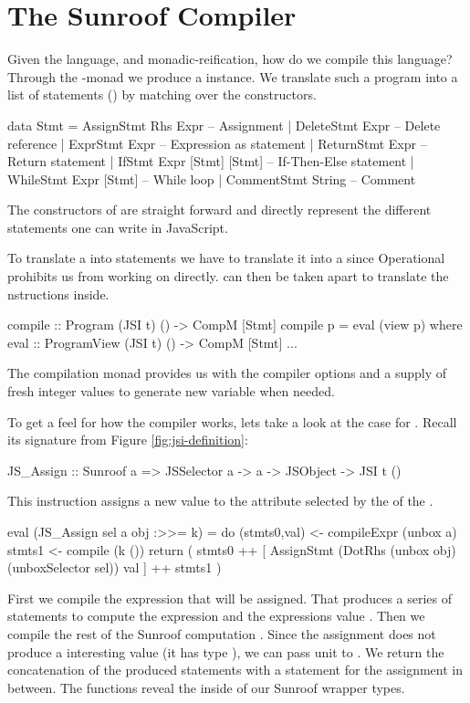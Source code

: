  
\section{The Sunroof Compiler}
\label{sec:compiler}

Given the language, and monadic-reification, how do we compile this language?
Through the \JS-monad we produce a  instance. We 
translate such a program into a list of statements () by matching over 
the \JSI constructors.
\begin{Code}
data Stmt 
  = AssignStmt Rhs Expr       -- Assignment
  | DeleteStmt Expr           -- Delete reference
  | ExprStmt Expr             -- Expression as statement
  | ReturnStmt Expr           -- Return statement
  | IfStmt Expr [Stmt] [Stmt] -- If-Then-Else statement
  | WhileStmt Expr [Stmt]     -- While loop
  | CommentStmt String        -- Comment
\end{Code}
The constructors of  are straight forward and
directly represent the different statements one can write
in JavaScript.

To translate a  into statements we
have to translate it into a  since 
Operational prohibits us from working on  directly.
 can then be taken apart to translate 
the \JSI nstructions inside.
\begin{Code}
compile :: Program (JSI t) () -> CompM [Stmt]
compile p = eval (view p)
  where
    eval :: ProgramView (JSI t) () -> CompM [Stmt]
    ...
\end{Code}
The compilation monad  provides us with 
the compiler options and a supply of fresh integer
values to generate new variable when needed.

To get a feel for how the compiler works, lets take a look at 
the case for . Recall its signature from 
Figure \ref{fig:jsi-definition}:
\begin{Code}
JS_Assign :: Sunroof a => JSSelector a -> a -> JSObject -> JSI t ()
\end{Code}
This instruction assigns a new value  to the attribute
selected by the  of the .
\begin{Code}
eval (JS_Assign sel a obj :>>= k) = do
  (stmts0,val) <- compileExpr (unbox a)
  stmts1 <- compile (k ())
  return (  stmts0 
         ++ [ AssignStmt (DotRhs (unbox obj) 
                                 (unboxSelector sel)) 
                         val ] 
         ++ stmts1 )
\end{Code}
First we compile the expression that will be assigned. That
produces a series of statements to compute the expression and 
the expressions value .
Then we compile the rest of the Sunroof computation . Since 
the assignment does not produce a interesting value (it has type ),
we can pass unit to .
We return the concatenation of the produced statements with a statement 
for the assignment in between. The  functions reveal the 
 inside of our Sunroof wrapper types.

